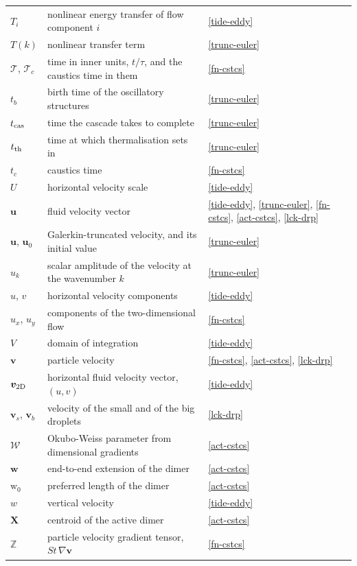 \begin{longtable}{@{}p{}p{}p{}@{}}
$T_i$ & nonlinear energy transfer of flow component $i$ & \ref{tide-eddy} \\
$T(k)$ & nonlinear transfer term & \ref{trunc-euler} \\
$\mathcal{T}$, $\mathcal{T}_c$ & time in inner units, $t/\tau$, and the caustics time in them & \ref{fn-cstcs} \\
$t_b$ & birth time of the oscillatory structures & \ref{trunc-euler} \\
$t_{\rm cas}$ & time the cascade takes to complete & \ref{trunc-euler} \\
$t_{\rm th}$ & time at which thermalisation sets in & \ref{trunc-euler} \\
$t_c$ & caustics time & \ref{fn-cstcs} \\
$U$ & horizontal velocity scale & \ref{tide-eddy} \\
$\boldsymbol{u}$ & fluid velocity vector & \ref{tide-eddy}, \ref{trunc-euler},  \ref{fn-cstcs}, \ref{act-cstcs}, \ref{lck-drp} \\
$\mathbf{u}$, $\mathbf{u}_0$ & Galerkin-truncated velocity, and its initial value & \ref{trunc-euler} \\
$\hat{u}_k$ & scalar amplitude of the velocity at the wavenumber $k$ & \ref{trunc-euler} \\
$u$, $v$ & horizontal velocity components & \ref{tide-eddy} \\
$u_x$, $u_y$ & components of the two-dimensional flow & \ref{fn-cstcs} \\
$V$ & domain of integration & \ref{tide-eddy} \\
$\boldsymbol{v}$ & particle velocity & \ref{fn-cstcs}, \ref{act-cstcs}, \ref{lck-drp} \\
$\boldsymbol{v}_{\rm 2D}$ & horizontal fluid velocity vector, $(u,v)$ & \ref{tide-eddy} \\
$\boldsymbol{v}_s$, $\boldsymbol{v}_b$ & velocity of the small and of the big droplets & \ref{lck-drp} \\
$\mathcal{W}$ & Okubo-Weiss parameter from dimensional gradients & \ref{act-cstcs} \\
$\mathbf{w}$ & end-to-end extension of the dimer & \ref{act-cstcs} \\
$\mathrm{w}_0$ & preferred length of the dimer & \ref{act-cstcs} \\
$w$ & vertical velocity & \ref{tide-eddy} \\
$\mathbf{X}$ & centroid of the active dimer & \ref{act-cstcs} \\
$\mathbb{Z}$ & particle velocity gradient tensor, $St\,\nabla\boldsymbol{v}$ & \ref{fn-cstcs} \\

\end{longtable}
